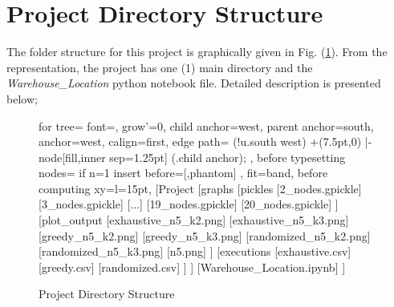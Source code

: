 \documentclass[longpaper, english, final, times]{revdetua}
\begin{document}
	\section{\label{outline:project-structure} Project Directory Structure}
	
		The folder structure for this project is graphically given in Fig. (\ref{figure:projectDirectoryStructure}). 
		From the representation, the project has one (1) main directory and the \textit{Warehouse\_Location} python notebook file. Detailed description is presented below;
		\begin{figure}[!ht]
			\begin{center}
				\begin{forest}
					for tree={
						font=\ttfamily,
						grow'=0,
						child anchor=west,
						parent anchor=south,
						anchor=west,
						calign=first,
						edge path={
							\noexpand{}
							(!u.south west) +(7.5pt,0) |- node[fill,inner sep=1.25pt] {} (.child anchor);
						},
						before typesetting nodes={
							if n=1
							{insert before={[,phantom]}}
							{}
						},
						fit=band,
						before computing xy={l=15pt},
					}
					[Project
					[graphs
					[pickles
						[2\_nodes.gpickle]
						[3\_nodes.gpickle]
						[...]
						[19\_nodes.gpickle]
						[20\_nodes.gpickle]
					]
					[plot\_output
						[exhaustive\_n5\_k2.png]
						[exhaustive\_n5\_k3.png]
						[greedy\_n5\_k2.png]
						[greedy\_n5\_k3.png]
						[randomized\_n5\_k2.png]
						[randomized\_n5\_k3.png]
						[n5.png]
					]
					[executions
						[exhaustive.csv]
						[greedy.csv]
						[randomized.csv]
					]
					]
					[Warehouse\_Location.ipynb]
					]
				\end{forest}
			\end{center}
			\caption{Project Directory Structure}
			\label{figure:projectDirectoryStructure}
		\end{figure}
	
\end{document}

